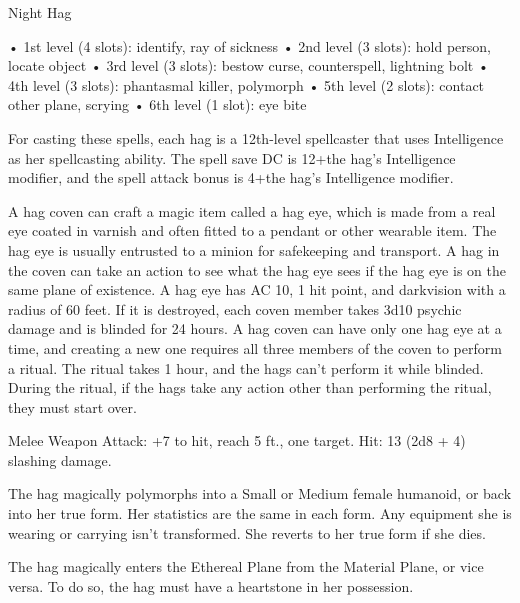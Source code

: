 \begin{monsterbox}{Night Hag}
\begin{monsteraction}
• 1st level (4 slots): identify, ray of sickness
• 2nd level (3 slots): hold person, locate object
• 3rd level (3 slots): bestow curse, counterspell, lightning bolt
• 4th level (3 slots): phantasmal killer, polymorph
• 5th level (2 slots): contact other plane, scrying
• 6th level (1 slot): eye bite

For casting these spells, each hag is a 12th-level spellcaster that uses Intelligence as her spellcasting ability. The spell save DC is 12+the hag's Intelligence modifier, and the spell attack bonus is 4+the hag's Intelligence modifier.
\end{monsteraction}
\begin{monsteraction}
A hag coven can craft a magic item called a hag eye, which is made from a real eye coated in varnish and often fitted to a pendant or other wearable item. The hag eye is usually entrusted to a minion for safekeeping and transport. A hag in the coven can take an action to see what the hag eye sees if the hag eye is on the same plane of existence. A hag eye has AC 10, 1 hit point, and darkvision with a radius of 60 feet. If it is destroyed, each coven member takes 3d10 psychic damage and is blinded for 24 hours.
A hag coven can have only one hag eye at a time, and creating a new one requires all three members of the coven to perform a ritual. The ritual takes 1 hour, and the hags can't perform it while blinded. During the ritual, if the hags take any action other than performing the ritual, they must start over.
\end{monsteraction}
\begin{monsteraction}
Melee Weapon Attack: +7 to hit, reach 5 ft., one target. Hit: 13 (2d8 + 4) slashing damage.
\end{monsteraction}
\begin{monsteraction}
The hag magically polymorphs into a Small or Medium female humanoid, or back into her true form. Her statistics are the same in each form. Any equipment she is wearing or carrying isn't transformed. She reverts to her true form if she dies.
\end{monsteraction}
\begin{monsteraction}[Etherealness]
The hag magically enters the Ethereal Plane from the Material Plane, or vice versa. To do so, the hag must have a heartstone in her possession.
\end{monsteraction}
\begin{monsteraction}

\end{monsteraction}
\end{monsterbox}
